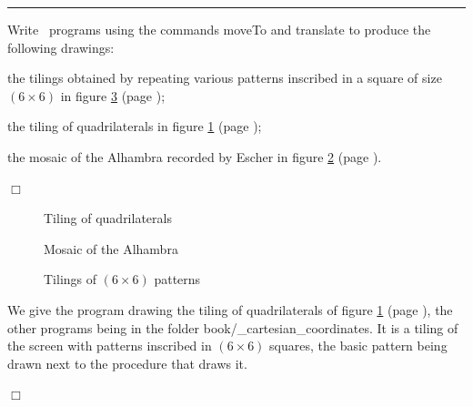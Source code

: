 \noindent \rule{137mm}{0.1mm}\par\nopagebreak %
\begin{exercices}{Write \python\ programs using the commands
{\idt move\-To} and {\idt trans\-late} to produce the following drawings:

\tiret  the tilings obtained by repeating various patterns inscribed in a square of
size $(6 \times 6)$ in figure \ref{fig:pm6x6} (page \pageref{fig:pm6x6});

\tiret  the tiling of quadrilaterals in figure \ref{fig:pavqua} (page \pageref{fig:pavqua});

\tiret  the mosaic of the Alhambra recorded by Escher \cite{escher1} in figure 
\ref{fig:mosa5} (page \pageref{fig:mosa5}).

\noindent $\Box$}\end{exercices}
\begin{figure}[htbp]
 \caption{Tiling of quadrilaterals}\label{fig:pavqua}
\end{figure}
\begin{figure}[htbp]
 \caption{Mosaic of the Alhambra}\label{fig:mosa5}
\end{figure}
\begin{figure}[htbp]
 \caption{Tilings of $(6 \times 6)$ patterns}\label{fig:pm6x6}
\end{figure}
\begin{corrige}{
We give the program drawing the tiling of quadrilaterals of figure \ref{fig:pavqua} (page 
\pageref{fig:pavqua}), the other programs being in the folder {\idt book/\_cartesian\_coordinates}. It is a tiling of
the screen with patterns inscribed in $(6 \times 6)$ squares, the basic pattern being
drawn next to the procedure that draws it.

\noindent $\Box$}\end{corrige}
\vfill

